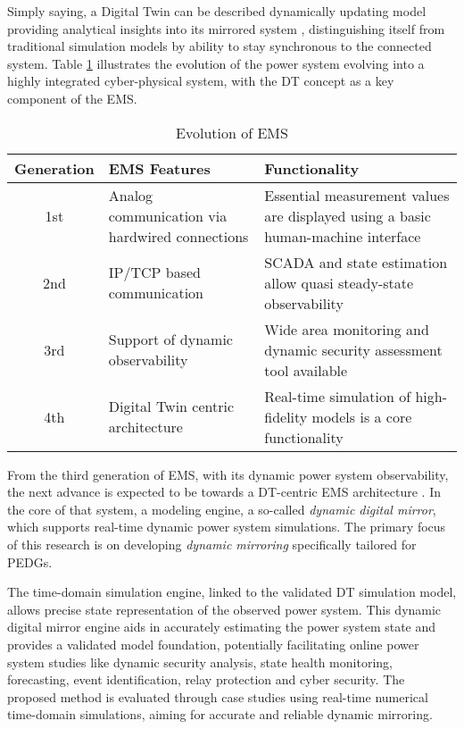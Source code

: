 
Simply saying, a Digital Twin can be described dynamically updating model providing analytical insights into its mirrored system , distinguishing itself from traditional simulation models by ability to stay synchronous to the connected system. Table \ref{tab:ems_evol} illustrates the evolution of the power system evolving into a highly integrated cyber-physical system, with the DT concept as a key component of the EMS.

\begin{table} [htbp]
    \centering
    \begin{threeparttable}%
        \caption{Evolution of EMS \autocite{8398846}}\label{tab:ems_evol}%
        \begin{tabular}{| c || p{5cm} | p{8cm} |}
            \hline
            \hline
                 \textbf{Generation} & \textbf{EMS Features} & \textbf{Functionality}\\ \hline
                1st & Analog communication via hardwired connections & Essential measurement values are displayed using a basic human-machine interface \\ \hline
                2nd & IP/TCP based  communication & SCADA and state estimation allow quasi steady-state observability \\ \hline
                3rd & Support of dynamic  observability & Wide area monitoring and dynamic security assessment tool available \\ \hline
                4th & Digital Twin centric architecture & Real-time simulation of high-fidelity models is a core functionality \\ \hline
            \hline
        \end{tabular}
    \end{threeparttable}
\end{table}

From the third generation of EMS, with its dynamic power system observability, the next advance is expected to be towards a DT-centric EMS architecture \autocite{dbt_mods_00054812}. In the core of that system, a modeling engine, a so-called \textit{dynamic digital mirror}, which supports real-time dynamic power system simulations. The primary focus of this research is on developing \textit{dynamic mirroring} specifically tailored for PEDGs.

The time-domain simulation engine, linked to the validated DT simulation model, allows precise state representation of the observed power system. This dynamic digital mirror engine aids in accurately estimating the power system state and provides a validated model foundation, potentially facilitating online power system studies like dynamic security analysis, state health monitoring, forecasting, event identification, relay protection and cyber security. The proposed method is evaluated through case studies using real-time numerical time-domain simulations, aiming for accurate and reliable dynamic mirroring.



